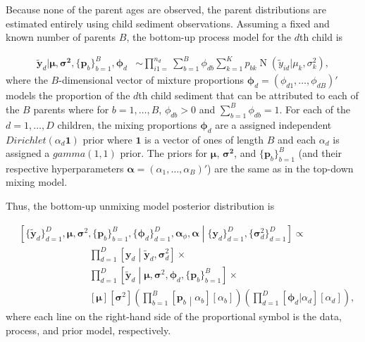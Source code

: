 Because none of the parent ages are observed, the parent distributions are estimated entirely using child sediment observations. Assuming a fixed and known number of parents $B$, the bottom-up process model for the $d$th child is

\begin{align*}
\tilde{\mathbf{y}}_{d} | \boldsymbol{\mu}, \boldsymbol{\sigma^2}, \{ \boldsymbol{p}_b \}_{b=1}^B, \boldsymbol{\phi}_d & \sim \prod_{i1=}^{n_d} \sum_{b=1}^B \phi_{db} \sum_{k=1}^K p_{bk} \operatorname{N}(\tilde{y}_{id} | \mu_{k}, \sigma^2_{k}),
\end{align*}
where the $B$-dimensional vector of mixture proportions $\boldsymbol{\phi}_d = \left( \phi_{d1}, \ldots, \phi_{dB} \right)'$ models the proportion of the $d$th child sediment that can be attributed to each of the $B$ parents where for $b = 1, \ldots, B$, $\phi_{db}>0$ and $\sum_{b=1}^B \phi_{db} = 1$. 
For each of the $d = 1, \ldots, D$ children, the mixing proportions $\boldsymbol{\phi}_d$ are a assigned independent $Dirichlet(\alpha_{d} \mathbf{1})$ prior where $\mathbf{1}$ is a vector of ones of length $B$ and each $\alpha_{d}$ is assigned a $gamma(1, 1)$ prior. The priors for $\boldsymbol{\mu}$, $\boldsymbol{\sigma^2}$, and $\{\mathbf{p}_{b}\}_{b=1}^B$ (and their respective hyperparameters $\boldsymbol{\alpha} = (\alpha_1, \ldots, \alpha_B)'$) are the same as in the top-down mixing model.


Thus, the bottom-up unmixing model posterior distribution is 

\begin{align*}
& \left[ \{ \tilde{\mathbf{y}}_d \}_{d=1}^D, \boldsymbol{\mu}, \boldsymbol{\sigma}^2, \{ \boldsymbol{p}_b \}_{b=1}^B, \{ \boldsymbol{\phi}_d \}_{d=1}^D, \boldsymbol{\alpha}_{\phi}, \boldsymbol{\alpha} \middle| \{ \mathbf{y}_d\}_{d=1}^D, \{\boldsymbol{\sigma}^2_{d} \}_{d=1}^D \right] \propto \\
& \hspace{3cm} \prod_{d=1}^D \left[\mathbf{y}_d \middle| \mathbf{\tilde{y}}_d, \boldsymbol{\sigma}_{d}^2 \right] \times \\
& \hspace{3cm} 
\prod_{d=1}^D \left[ \tilde{\mathbf{y}}_d \middle| \boldsymbol{\mu}, \boldsymbol{\sigma}^2, \boldsymbol{\phi}_d, \{ \boldsymbol{p}_b \}_{b=1}^B \right] \times \\
& \hspace{3cm} 
\left[ \boldsymbol{\mu}\right]
\left[ \boldsymbol{\sigma}^2 \right]
\left( \prod_{b=1}^B \left[ \boldsymbol{p}_b \middle| \alpha_b \right]
\left[ \alpha_b \right] \right)
\left( \prod_{d=1}^D \left[ \boldsymbol{\phi}_d | \alpha_{d} \right]
\left[ \alpha_{d} \right] \right),
\end{align*}
where each line on the right-hand side of the proportional symbol is the data, process, and prior model, respectively.